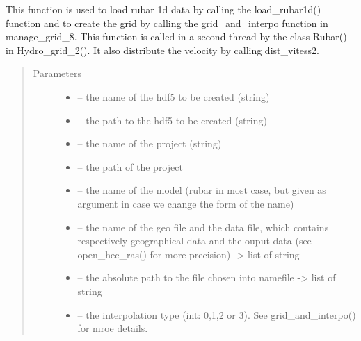 \documentclass[letterpaper,10pt,english]{sphinxmanual}
\begin{document}
\begin{fulllineitems}
\label{\detokenize{index:src.rubar.load_rubar1d_and_create_grid}}
This function is used to load rubar 1d data by calling the load\_rubar1d() function and to create the grid
by calling the grid\_and\_interpo function in manage\_grid\_8. This function is called in a second thread by the class
Rubar() in Hydro\_grid\_2(). It also distribute the velocity by calling dist\_vitess2.
\begin{quote}\begin{description}
\item[{Parameters}] \leavevmode\begin{itemize}
\item {} 
 -- the name of the hdf5 to be created (string)

\item {} 
 -- the path to the hdf5 to be created (string)

\item {} 
 -- the name of the project (string)

\item {} 
 -- the path of the project

\item {} 
 -- the name of the model (rubar in most case, but given as argument in case we change
the form of the name)

\item {} 
 -- the name of the geo file and the data file, which contains respectively geographical data and
the ouput data (see open\_hec\_ras() for more precision) -\textgreater{} list of string

\item {} 
 -- the absolute path to the file chosen into namefile -\textgreater{} list of string

\item {} 
 -- the interpolation type (int: 0,1,2 or 3). See grid\_and\_interpo() for mroe details.


\end{itemize}
\end{description}
\end{quote}
\end{fulllineitems}
\end{document}
